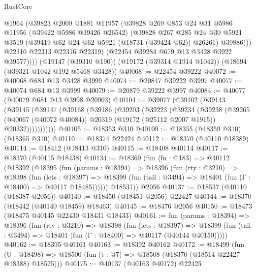 \begin{lexlean}{RustCore}
\begin{coremodule}
            @1964
            (@39823
              @2000
              @1881
              @11957
              (@39828
                @269
                @853
                @24
                @31
                @5986
                @11956
                (@39422 @5986 @39426 @26542)
                (@39828
                  @267
                  @285
                  @24
                  @30
                  @5921
                  @3519
                  (@39419 @62 @24 @62 @5921 (@18731 (@39424 @62)) @26261)
                  @39886)))
            @22310
            @22313
            @22316
            @22319)
          (@22454 @39284 @679 @13 @3428 @3922 @39577))))
    (@19147 (@39310 @190))
    (@19172 (@39314 @1914 @1042))
    (@18694 (@39321 @1042 @192 @5468 @3428))
@40068 := @22454 @39222
@40072 := @40068 @684 @13 @3428 @3999
@40074 := @20847 @39222 @3997
@40077 := @40074 @684 @13 @3999
@40079 := @20879 @39222 @3997
@40084 := @40077 (@40079 @681 @13 @3998 @20903)
@40104 := @39077
    (@39102
      (@39143
        (@39145
          (@39147
            (@39168
              (@39186
                (@39203
                  (@39223
                    (@39234
                      (@39238
                        (@39265
                          (@40067 (@40072 @40084))
                          @20319
                          (@19172 (@25112 @2007 @1915))
                          @20332)))))))))))
@40105 := @18353 @310
@40109 := @18355 (@18359 @310) (@18365 @310)
@40110 := @18374 @22424
@40112 := @18370 (@40110 @18389)
@40114 := @18412 (@18413 @310)
@40115 := @18408 @40114
@40117 := @18370 (@40115 @18438)
@40134 := @18369
    (fun (fn : @183) =>
    @40112
      (@18392
        (@18395
          (fun (params : @18394) =>
          @18396
            (fun (rty : @3210) =>
            @18398
              (fun (lets : @18397) =>
              @18399 (fun (tail : @3494) => @18401 (fun (Γ : @18400) => @40117 @18485))))))
        @18531))
    @2056
@40137 := @18537 (@40110 (@18387 @2056))
@40140 := @18450 (@18451 @2056) @22427
@40144 := @18370 (@18442 (@40140 @18459) @18463)
@40145 := @18476 @2056
@40150 := @18473 (@18475 @40145 @22430 @18431 @18433)
@40161 := fun (params : @18394) =>
  @18396
    (fun (rty : @3210) =>
    @18398
      (fun (lets : @18397) =>
      @18399 (fun (tail : @3494) => @18401 (fun (Γ : @18400) => @40117 (@40144 @40150)))))
@40162 := @18395 @40161
@40163 := @18392 @40162
@40172 := @18499
    (fun (U : @18498) => @18500 (fun (t : @7) => @18508 (@18370 (@18514 @22427 @18388) @18525)))
@40175 := @40137 (@40163 @40172) @22425

\end{coremodule}
\end{lexlean}
